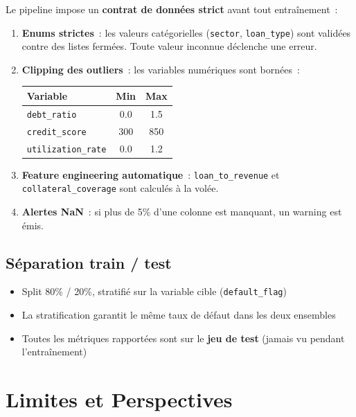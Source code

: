 \documentclass[12pt,a4paper]{article}
\begin{document}
Le pipeline impose un \textbf{contrat de donn\'ees strict} avant tout entra\^inement~:

\begin{enumerate}
    \item \textbf{Enums strictes}~: les valeurs cat\'egorielles (\texttt{sector}, \texttt{loan\_type}) sont valid\'ees contre des listes ferm\'ees. Toute valeur inconnue d\'eclenche une erreur.
    \item \textbf{Clipping des outliers}~: les variables num\'eriques sont born\'ees~:
    \begin{center}
    \begin{tabular}{lcc}
    \toprule
    \textbf{Variable} & \textbf{Min} & \textbf{Max} \\
    \midrule
    \texttt{debt\_ratio} & 0.0 & 1.5 \\
    \texttt{credit\_score} & 300 & 850 \\
    \texttt{utilization\_rate} & 0.0 & 1.2 \\
    \bottomrule
    \end{tabular}
    \end{center}
    \item \textbf{Feature engineering automatique}~: \texttt{loan\_to\_revenue} et \texttt{collateral\_coverage} sont calcul\'es \`a la vol\'ee.
    \item \textbf{Alertes NaN}~: si plus de 5\% d'une colonne est manquant, un warning est \'emis.
\end{enumerate}

\subsection{S\'eparation train / test}

\begin{itemize}[noitemsep]
    \item Split 80\% / 20\%, stratifi\'e sur la variable cible (\texttt{default\_flag})
    \item La stratification garantit le m\^eme taux de d\'efaut dans les deux ensembles
    \item Toutes les m\'etriques rapport\'ees sont sur le \textbf{jeu de test} (jamais vu pendant l'entra\^inement)
\end{itemize}


\section{Limites et Perspectives}
\end{document}
